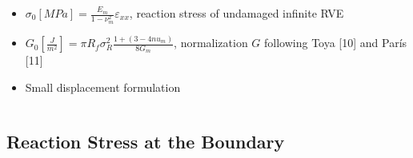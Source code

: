 \documentclass[first,firstsupp,lastsupp,last,hyperref,table]{ETHclass}
\begin{document}
\begin{frame}
\begin{columns}
\begin{column}{0.4\textwidth}
\begin{itemize}[label=]
\item $\sigma_{0}\left[MPa\right]=\frac{E_{m}}{1-\nu_{m}^{2}}\varepsilon_{xx}$, reaction stress of undamaged infinite RVE\\[5pt]
\item $G_{0}\left[\frac{J}{m^{2}}\right]=\pi R_{f}\sigma_{R}^{2}\frac{1+\left(3-4 nu_{m}\right)}{8 G_{m}}$, normalization $G$ following Toya [10] and Par\'is [11]\\[5pt]
\item Small displacement formulation
\end{itemize}
\end{column}
\end{columns}
\end{frame}

\subsection{Reaction Stress at the Boundary}
\end{document}
